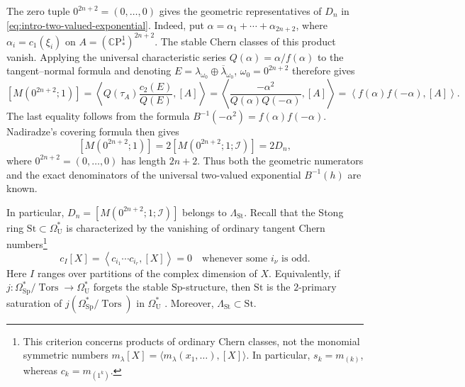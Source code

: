 \documentclass[14pt,dvipsnames]{extarticle}
\numberwithin{equation}{subsection}
\theoremstyle{plain}
\theoremstyle{definition}
\theoremstyle{definition}
\DeclareMathOperator{\Tors}{Tors}
\newcommand{\OmU}{\Omega_{\mathrm U}^{\ast}}
\newcommand{\OmSp}{\Omega_{\mathrm{Sp}}^{\ast}}
\newcommand{\CP}{\mathbb{C}\mathrm P}
\newcommand{\Sp}{\mathrm{Sp}}
\newcommand{\Ii}{\mathcal I}
\newcommand{\St}{\mathrm{St}}
\newcommand{\LambdaSt}{\Lambda_{\mathrm{St}}}
\begin{document}
The zero tuple $0^{2n+2} = (0,\ldots, 0)$ gives the geometric representatives of $D_n$ in \eqref{eq:intro-two-valued-exponential}.
Indeed, put $\alpha=\alpha_1+\cdots+\alpha_{2n+2}$, where
$\alpha_i=c_1(\xi_i)$
on $A = (\CP_*^1)^{2n+2}$. The stable Chern classes of this product vanish.
Applying the universal characteristic series $Q(\alpha)=\alpha/f(\alpha)$ to the
tangent--normal formula and denoting $E=\lambda_{\omega_0}\oplus\overline{\lambda}_{\omega_0}$, $\omega_0 = 0^{2n+2}$ therefore gives
\[
[M(0^{2n+2};1)]
=
\left\langle
Q(\tau_A)\frac{c_2(E)}{Q(E)},
[A]
\right\rangle
=
\left\langle
\frac{-\alpha^2}{Q(\alpha)Q(-\alpha)},
[A]
\right\rangle
=
\left\langle f(\alpha)f(-\alpha),[A]\right\rangle.
\]
The last equality follows from the formula
$B^{-1}(-\alpha^2)=f(\alpha)f(-\alpha)$.
Nadiradze's covering formula then gives
\[
[M(0^{2n+2};1)]=2[M(0^{2n+2};1;\Ii)] = 2D_n,
\]
where $0^{2n+2}=(0,\ldots,0)$ has length $2n+2$.
Thus both the geometric numerators and the exact denominators of the universal
two-valued exponential $B^{-1}(h)$ are known.

In particular, $D_n=[M(0^{2n+2};1;\Ii)]$ belongs to $\LambdaSt$.
Recall that the Stong ring $\St\subset\OmU$ is characterized by the
vanishing of ordinary tangent Chern numbers\footnote{This criterion concerns
products of ordinary Chern classes, not the monomial symmetric numbers
$m_\lambda[X]=\langle m_\lambda(x_1,\ldots),[X]\rangle$. In particular,
$s_k=m_{(k)}$, whereas $c_k=m_{(1^k)}$.}
\[
 c_I[X]=\left\langle c_{i_1}\cdots c_{i_r},[X]\right\rangle=0
 \quad\text{whenever some }i_\nu\text{ is odd}.
\]
Here $I$ ranges over partitions of the complex dimension of $X$. Equivalently, if
$j\colon\OmSp/\Tors\to\OmU$ forgets the stable $\Sp$-structure, then
$\St$ is the $2$-primary saturation of $j(\OmSp/\Tors)$ in $\OmU$
\cite[Theorem~4.1 and Lemma~6.6]{Buc78}. Moreover, $\LambdaSt\subset\St$.
\end{document}
